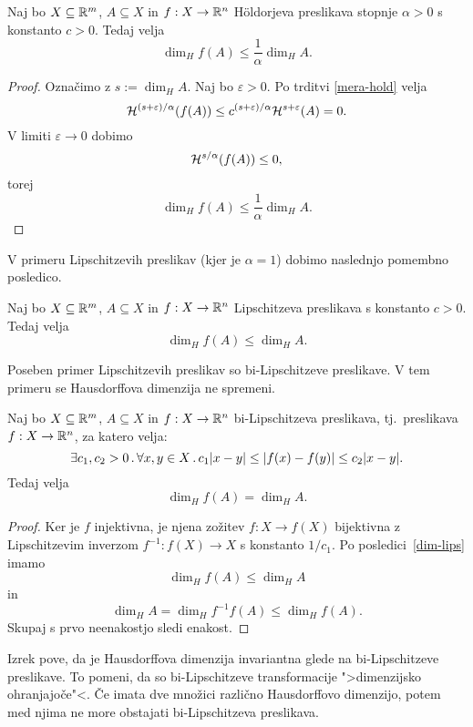 \begin{trditev}
    Naj bo \(X \subseteq \mathbb{R}^m\), \(A \subseteq X\) in \(f: X \to \mathbb{R}^n\) H\"oldorjeva preslikava stopnje \(\alpha > 0\) s konstanto \(c > 0\). Tedaj velja
    \[\dim_H f(A) \leq \frac{1}{\alpha} \dim_H A.\]
\end{trditev}

\begin{proof}
    Označimo z \(s:= \dim_H A\). Naj bo \(\varepsilon > 0\). Po trditvi \ref{mera-hold} velja
    \[\mathcal{H}^{(s +\varepsilon) / \alpha}(f(A)) \leq c^{(s +\varepsilon) / \alpha} \mathcal{H}^{s + \varepsilon}(A) = 0.\]
    V limiti \(\varepsilon \to 0\) dobimo
    \[\mathcal{H}^{s / \alpha}(f(A)) \leq 0,\]
    torej
    \[\dim_H f(A) \leq \frac{1}{\alpha} \dim_H A.\]
\end{proof}

V primeru Lipschitzevih preslikav (kjer je \(\alpha = 1\)) dobimo naslednjo pomembno posledico.

\begin{posledica}
    \label{dim-lips}
    Naj bo \(X \subseteq \mathbb{R}^m\), \(A \subseteq X\) in \(f: X \to \mathbb{R}^n\) Lipschitzeva preslikava s konstanto \(c > 0\). Tedaj velja
    \[\dim_H f(A) \leq \dim_H A.\]
\end{posledica}

Poseben primer Lipschitzevih preslikav so bi-Lipschitzeve preslikave. V tem primeru se Hausdorffova dimenzija ne spremeni.

\begin{izrek}
    Naj bo \(X \subseteq \mathbb{R}^m\), \(A \subseteq X\) in \(f: X \to \mathbb{R}^n\) bi-Lipschitzeva preslikava, tj.\ preslikava \(f: X \to \mathbb{R}^n\), za katero velja:
    \[\exists c_1, c_2 > 0 \,.\, \forall x, y \in X \,.\, c_1|x-y| \leq |f(x) - f(y)| \leq c_2|x-y|.\]
    Tedaj velja
    \[\dim_H f(A) = \dim_H A.\]
\end{izrek}

\begin{proof}
    Ker je \(f\) injektivna, je njena zožitev \(f: X \to f(X)\) bijektivna z Lipschitzevim inverzom \(f^{-1}: f(X) \to X\) s konstanto \(1 / c_1\). Po posledici~\ref{dim-lips} imamo
    \[\dim_H f(A) \leq \dim_H A\]
    in 
    \[\dim_H A = \dim_H f^{-1}f(A) \leq \dim_H f(A).\]
    Skupaj s prvo neenakostjo sledi enakost.
\end{proof}

Izrek pove, da je Hausdorffova dimenzija invariantna glede na bi-Lipschit\-zeve preslikave. To pomeni, da so bi-Lipschitzeve transformacije ">dimenzijsko ohranjajoče"<. Če imata dve množici različno Hausdorffovo dimenzijo, potem med njima ne more obstajati bi-Lipschitzeva preslikava.

